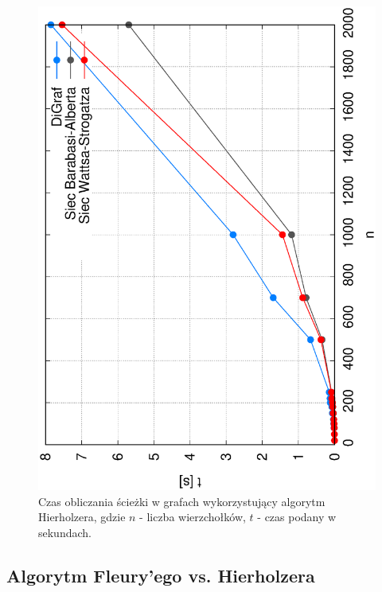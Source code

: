 \documentclass[a4paper, 12pt, twoside, openright]{article}
\begin{document}
\begin{figure}[h]
	\centering
	\includegraphics[angle=270,width=1\textwidth]{img/wyniki/Hierholzer_n}
	\caption[]{Czas obliczania ścieżki w grafach wykorzystujący algorytm Hierholzera, gdzie $n$ - liczba wierzchołków, $t$ - czas podany w sekundach.}
	\label{hie_n}
\end{figure}
\newpage




\subsection{Algorytm Fleury'ego vs. Hierholzera}
\end{document}

